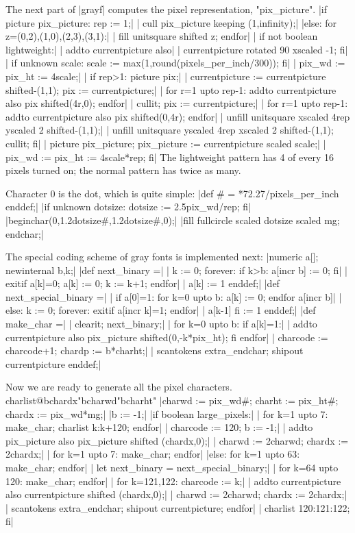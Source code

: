 The next part of |grayf| computes the pixel representation, "pix\_picture".
\beginlines
|if picture pix_picture: rep := 1;|
| cull pix_picture keeping (1,infinity);|
|else: for z=(0,2),(1,0),(2,3),(3,1):|
|  fill unitsquare shifted z; endfor|
| if not boolean lightweight:|
|  addto currentpicture also|
|  currentpicture rotated 90 xscaled -1; fi|
| if unknown scale: scale := max(1,round(pixels_per_inch/300)); fi|
| pix_wd := pix_ht := 4scale;|
| if rep>1: picture pix;|
|  currentpicture := currentpicture shifted-(1,1); pix := currentpicture;|
|  for r=1 upto rep-1: addto currentpicture also pix shifted(4r,0); endfor|
|  cullit; pix := currentpicture;|
|  for r=1 upto rep-1: addto currentpicture also pix shifted(0,4r); endfor|
|  unfill unitsquare xscaled 4rep yscaled 2 shifted-(1,1);|
|  unfill unitsquare yscaled 4rep xscaled 2 shifted-(1,1); cullit; fi|
| picture pix_picture; pix_picture := currentpicture scaled scale;|
| pix_wd := pix_ht := 4scale*rep; fi|
\weakendlines
The lightweight pattern has 4 of every 16 pixels turned on; the normal
pattern has twice as many.

Character 0 is the dot, which is quite simple:
\beginlines
|def # = *72.27/pixels_per_inch enddef;|
|if unknown dotsize: dotsize := 2.5pix_wd/rep; fi|
\smallskip
|beginchar(0,1.2dotsize#,1.2dotsize#,0);|
|fill fullcircle scaled dotsize scaled mg; endchar;|
\endlines

The special coding scheme of gray fonts is implemented next:
\beginlines
|numeric a[]; newinternal b,k;|
|def next_binary =|
| k := 0; forever: if k>b: a[incr b] := 0; fi|
|  exitif a[k]=0; a[k] := 0; k := k+1; endfor|
| a[k] := 1 enddef;|
|def next_special_binary =|
| if a[0]=1: for k=0 upto b: a[k] := 0; endfor a[incr b]|
| else: k := 0; forever: exitif a[incr k]=1; endfor|
|  a[k-1] fi := 1 enddef;|
\smallbreak
|def make_char =|
| clearit; next_binary;|
| for k=0 upto b: if a[k]=1:|
|  addto currentpicture also pix_picture shifted(0,-k*pix_ht); fi endfor|
| charcode := charcode+1; chardp := b*charht;|
| scantokens extra_endchar; shipout currentpicture enddef;|
\endlines

Now we are ready to generate all the pixel characters.
^^@charlist@^^"chardx"^^"charwd"^^"charht"
\beginlines
|charwd := pix_wd#; charht := pix_ht#; chardx := pix_wd*mg;|
|b := -1;|
\smallskip
|if boolean large_pixels:|
| for k=1 upto 7: make_char; charlist k:k+120; endfor|
| charcode := 120; b := -1;|
| addto pix_picture also pix_picture shifted (chardx,0);|
| charwd := 2charwd; chardx := 2chardx;|
| for k=1 upto 7: make_char; endfor|
|else: for k=1 upto 63: make_char; endfor|
| let next_binary = next_special_binary;|
| for k=64 upto 120: make_char; endfor|
| for k=121,122: charcode := k;|
|  addto currentpicture also currentpicture shifted (chardx,0);|
|  charwd := 2charwd; chardx := 2chardx;|
|  scantokens extra_endchar; shipout currentpicture; endfor|
| charlist 120:121:122; fi|
\endlines

